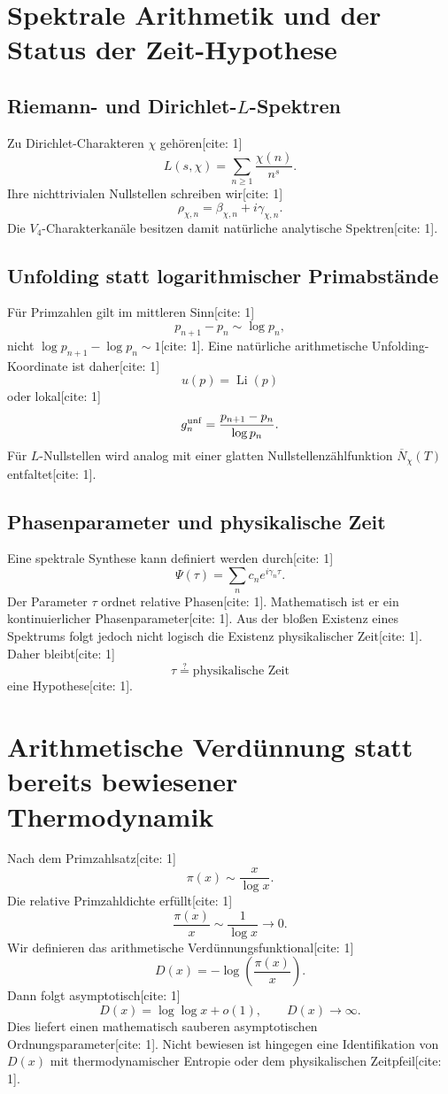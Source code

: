 \documentclass[11pt,a4paper]{article}
\begin{document}
\section{Spektrale Arithmetik und der Status der Zeit-Hypothese}
\subsection{Riemann- und Dirichlet-$L$-Spektren}
Zu Dirichlet-Charakteren $\chi$ gehören[cite: 1]
\[
L(s,\chi)=\sum_{n\ge1}\frac{\chi(n)}{n^s}.
\]
Ihre nichttrivialen Nullstellen schreiben wir[cite: 1]
\[
\rho_{\chi,n}=\beta_{\chi,n}+i\gamma_{\chi,n}.
\]
Die $V_4$-Charakterkanäle besitzen damit natürliche analytische Spektren[cite: 1].

\subsection{Unfolding statt logarithmischer Primabstände}
Für Primzahlen gilt im mittleren Sinn[cite: 1]
\[
p_{n+1}-p_n\sim\log p_n,
\]
nicht $\log p_{n+1}-\log p_n\sim1$[cite: 1]. Eine natürliche arithmetische Unfolding-Koordinate ist daher[cite: 1]
\[
u(p)=\operatorname{Li}(p)
\]
oder lokal[cite: 1]
\[
g_n^{\rm unf}=\frac{p_{n+1}-p_n}{\log p_n}.
\]
Für $L$-Nullstellen wird analog mit einer glatten Nullstellenzählfunktion $\overline N_\chi(T)$ entfaltet[cite: 1].

\subsection{Phasenparameter und physikalische Zeit}
Eine spektrale Synthese kann definiert werden durch[cite: 1]
\[
\Psi(\tau)=\sum_n c_ne^{i\gamma_n\tau}.
\]
Der Parameter $\tau$ ordnet relative Phasen[cite: 1]. Mathematisch ist er ein kontinuierlicher Phasenparameter[cite: 1]. Aus der bloßen Existenz eines Spektrums folgt jedoch nicht logisch die Existenz physikalischer Zeit[cite: 1]. Daher bleibt[cite: 1]
\[
\boxed{\tau\stackrel{?}{=}\text{physikalische Zeit}}
\]
eine Hypothese[cite: 1].

\section{Arithmetische Verdünnung statt bereits bewiesener Thermodynamik}
Nach dem Primzahlsatz[cite: 1]
\[
\pi(x)\sim\frac{x}{\log x}.
\]
Die relative Primzahldichte erfüllt[cite: 1]
\[
\frac{\pi(x)}x\sim\frac1{\log x}\to0.
\]
Wir definieren das arithmetische Verdünnungsfunktional[cite: 1]
\[
\boxed{D(x)=-\log\left(\frac{\pi(x)}x\right).}
\]
Dann folgt asymptotisch[cite: 1]
\[
D(x)=\log\log x+o(1),\qquad D(x)\to\infty.
\]
Dies liefert einen mathematisch sauberen asymptotischen Ordnungsparameter[cite: 1]. Nicht bewiesen ist hingegen eine Identifikation von $D(x)$ mit thermodynamischer Entropie oder dem physikalischen Zeitpfeil[cite: 1].
\end{document}
